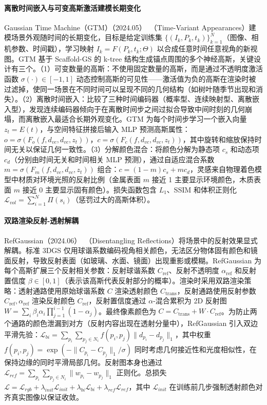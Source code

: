 \paragraph{离散时间嵌入与可变高斯激活建模长期变化}

Gaussian Time Machine（GTM）（2024.05）~\cite{2405_13694}（Time-Variant Appearances）建模场景外观随时间的长期变化，目标是给定训练集 $\{(I_k, P_k, t_k)\}_{k=1}^N$（图像、相机参数、时间戳），学习映射 $I_k = F(P_k, t_k; \Theta)$ 以合成任意时间任意视角的新视图。GTM 基于 Scaffold-GS 的 k-tree 结构生成锚点周围的多个神经高斯，关键设计有三个。（1）可变数量的高斯：不使用固定数量的高斯，而是通过不透明度激活函数 $\sigma(\cdot) \in [-1, 1]$ 动态控制高斯的可见性——激活值为负的高斯在渲染时被过滤掉，使同一场景在不同时间可以呈现不同的几何结构（如树叶随季节出现和消失）。（2）离散时间嵌入：比较了三种时间编码器（概率型、连续映射型、离散嵌入型），发现连续编码器倾向于在离散时间步之间过拟合导致中间时刻的几何崩塌，而离散嵌入最适合长期外观变化。GTM 为每个时间步学习一个嵌入向量 $z_t = E(t)$，与空间特征拼接后输入 MLP 预测高斯属性：$o = \sigma(F_o(f, d_{vc}, d_{vc}, z_t))$，$c = \sigma(F_c(f, d_{vc}, d_{vc}, z_t))$，其中旋转和缩放保持时间无关以保证几何一致性。（3）分解颜色混合：将颜色分解为静态项 $c_s$ 和动态项 $c_d$（分别由时间无关和时间相关 MLP 预测），通过自适应混合系数 $m = \sigma(F_m(f, d_{vc}, d_{vc}, z_t))$ 组合：$c = (1-m)c_s + m c_d$，灵感来自物理着色模型中材质对环境光照的反射比例（金属表面 $m$ 接近 1 主要显示环境颜色，木质表面 $m$ 接近 0 主要显示固有颜色）。损失函数包含 $L_1$、SSIM 和体积正则化 $\mathcal{L}_{vol} = \sum_{i=1}^N \Pi(s_i)$（惩罚过大的高斯体积）。

\paragraph{双路渲染反射-透射解耦}

RefGaussian（2024.06）~\cite{2406_05852}（Disentangling Reflections）将场景中的反射效果显式解耦。标准 3DGS 仅用球谐系数编码视角相关颜色，无法区分物体固有颜色和镜面反射，导致反射表面（如玻璃、水面、镜面）出现重影或模糊。RefGaussian 为每个高斯扩展三个反射相关参数：反射球谐系数 $C_{\text{ref}}$、反射不透明度 $\alpha_{\text{ref}}$ 和反射置信度 $\beta \in [0,1]$（表示该高斯代表反射部分的概率）。渲染时采用双路渲染策略：透射通路使用原始球谐系数 $C$ 渲染透射颜色 $C_{\text{trans}}$，反射通路使用反射参数 $C_{\text{ref}}, \alpha_{\text{ref}}$ 渲染反射颜色 $C_{\text{ref}}$，反射置信度通过 $\alpha$-混合累积为 2D 反射图 $W = \sum_{i} \beta_i \alpha_i \prod_{j=1}^{i-1}(1-\alpha_j)$。最终像素颜色为 $C = C_{\text{trans}} + W \cdot C_{\text{ref}}$。为防止两个通路的颜色泄漏到对方（反射内容出现在透射分量中），RefGaussian 引入双边平滑先验：$\mathcal{L}_{bi} = \sum_{p_i} \sum_{p_j \in N_i} f(p_i, p_j) \|d_{p_i} - d_{p_j}\|_1$，其中权重 $f(p_i, p_j) = \exp(-\|C_{p_i} - C_{p_j}\|_1 / \sigma)$ 同时考虑几何接近性和光度相似性，在保持边缘的同时平滑局部几何。反射图本身也通过 $\mathcal{L}_{ref} = \sum_{p_i} \sum_{p_j \in N_i} \|w_{p_i} - w_{p_j}\|_1$ 正则化。总损失 $\mathcal{L} = \mathcal{L}_{rgb} + \lambda_{init}\mathcal{L}_{init} + \lambda_{bi}\mathcal{L}_{bi} + \lambda_{ref}\mathcal{L}_{ref}$，其中 $\mathcal{L}_{init}$ 在训练前几步强制透射颜色对齐真实图像以保证收敛。

